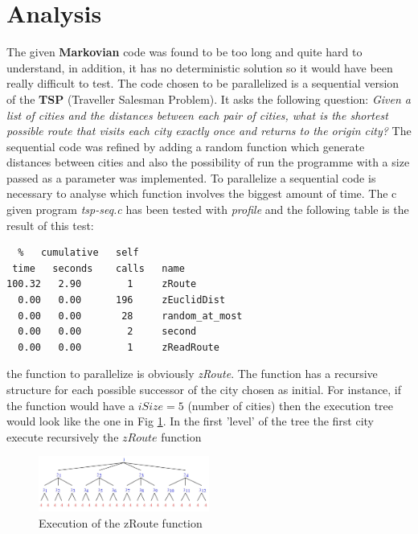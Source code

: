 \documentclass[11pt,conference]{IEEEtran}
\begin{document}
\section{Analysis}
The given \textbf{Markovian} code was found to be too long and quite hard to understand, in addition, it has no deterministic solution so it would have been really difficult to test.
\newline
The code chosen to be parallelized is a sequential version of the \textbf{TSP} (Traveller Salesman Problem). It asks the following question: \textit{Given a list of cities and the distances between each pair of cities, what is the shortest possible route that visits each city exactly once and returns to the origin city?} \cite{citation1}
\newline
The sequential code was refined by adding a random function which generate distances between cities and also the possibility of run the programme with a size passed as a parameter was implemented.
\newline
To parallelize a sequential code is necessary to analyse which function involves the biggest amount of time. The c given program \textit{tsp-seq.c} has been tested with \textit{profile} and the following table is the result of this test:
\begin{lstlisting}
  %   cumulative   self               
 time   seconds    calls   name    
100.32   2.90        1     zRoute
  0.00   0.00      196     zEuclidDist
  0.00   0.00       28     random_at_most
  0.00   0.00        2     second
  0.00   0.00        1     zReadRoute
\end{lstlisting}

the function to parallelize is obviously \textit{zRoute}.
\newline
The function has a recursive structure for each possible successor of the city chosen as initial. For instance, if the function would have a $iSize = 5$ (number of cities) then the execution tree would look like the one in Fig \ref{fig:tree}. 
In the first 'level' of the tree the first city execute recursively the $zRoute$ function 
\begin{figure}[h!]
  \centering
    \includegraphics[width=0.5\textwidth]{tree}
    \caption{Execution of the zRoute function}
    \label{fig:tree}
\end{figure}
\end{document}
